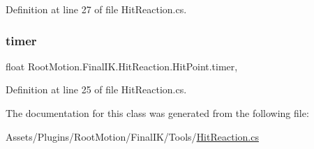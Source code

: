 Definition at line 27 of file Hit\+Reaction.\+cs.

\mbox{\label{class_root_motion_1_1_final_i_k_1_1_hit_reaction_1_1_hit_point_a6f6ebb5967321d40e501ae2229fc94c1}} 
\subsubsection{\texorpdfstring{timer}{timer}}
{\footnotesize\ttfamily float Root\+Motion.\+Final\+I\+K.\+Hit\+Reaction.\+Hit\+Point.\+timer\hspace{0.3cm}{\ttfamily [get]}, {\ttfamily [protected]}}



Definition at line 25 of file Hit\+Reaction.\+cs.



The documentation for this class was generated from the following file\+:\begin{DoxyCompactItemize}
\item 
Assets/\+Plugins/\+Root\+Motion/\+Final\+I\+K/\+Tools/\mbox{\hyperlink{_hit_reaction_8cs}{Hit\+Reaction.\+cs}}\end{DoxyCompactItemize}
